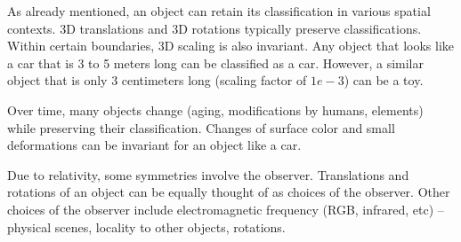 \documentclass[11pt]{article}
\begin{document}
As already mentioned, an object can retain its classification in various spatial contexts.
3D translations and 3D rotations typically preserve classifications.
Within certain boundaries, 3D scaling is also invariant.
Any object that looks like a car that is 3 to 5 meters long can be classified as a car.
However, a similar object that is only 3 centimeters long (scaling factor of $1e-3$) can be a toy.

Over time, many objects change (aging, modifications by humans, elements) while preserving their classification.
Changes of surface color and small deformations can be invariant for an object like a car.

Due to relativity, some symmetries involve the observer.
Translations and rotations of an object can be equally thought of as choices of the observer.
Other choices of the observer include electromagnetic frequency (RGB, infrared, etc)
-- physical scenes, locality to other objects, rotations.
\end{document}
